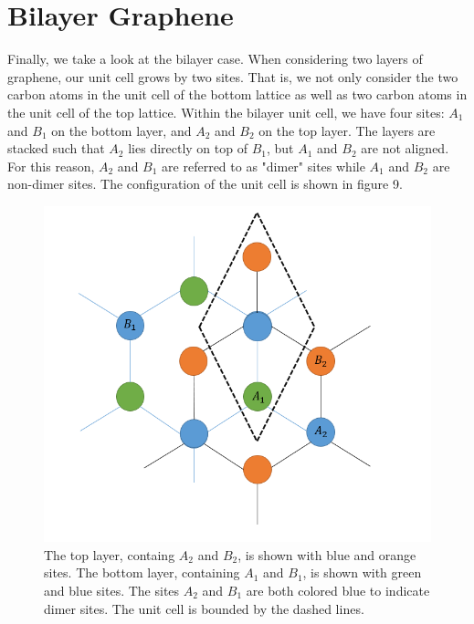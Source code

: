 \documentclass{article}
\begin{document}
\section{Bilayer Graphene}
Finally, we take a look at the bilayer case. When considering two layers of graphene, our unit cell grows by two sites. That is, we not only consider the
two carbon atoms in the unit cell of the bottom lattice as well as two carbon atoms in the unit cell of the top lattice. Within the bilayer unit cell,
we have four sites: $A_{1}$ and $B_{1}$ on the bottom layer, and $A_{2}$ and $B_{2}$ on the top layer. The layers are stacked such that $A_{2}$ lies
directly on top of $B_{1}$, but $A_{1}$ and $B_{2}$ are not aligned. For this reason, $A_{2}$ and $B_{1}$ are referred to as "dimer" sites while
$A_{1}$ and $B_{2}$ are non-dimer sites. The configuration of the unit cell is shown in figure 9. \par
\begin{figure}[h]
\centering
\includegraphics[scale=.50]{bilayer}
\caption{The top layer, containg $A_{2}$ and $B_{2}$, is shown with blue and orange sites. The bottom layer, containing $A_{1}$ and $B_{1}$, is shown with green and blue sites.
The sites $A_{2}$ and $B_{1}$ are both colored blue to indicate dimer sites. The unit cell is bounded by the dashed lines. }
\end{figure}
\end{document}
